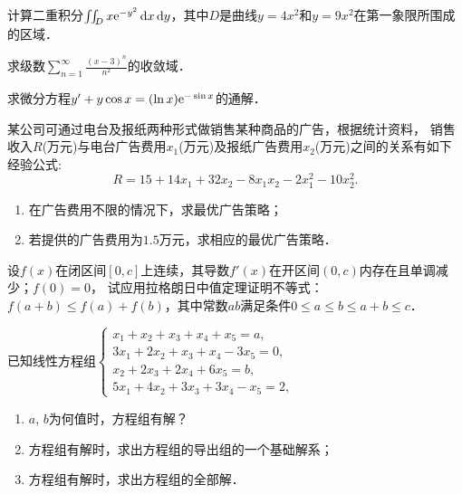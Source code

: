 \documentclass[plain,noanswer,medmath]{../../template/jnuexam}
\begin{document}
\begin{problem}
计算二重积分$\iint_D x\mathrm{e}^{-y^2}\mathop{}\!\mathrm{d} x\mathop{}\!\mathrm{d} y$，其中$D$是曲线$y=4x^2$和$y=9x^2$在第一象限所围成的区域．
\end{problem}


\begin{problem}
求级数$\sum_{n=1}^{\infty}\frac{(x-3)^n}{n^2}$的收敛域．
\end{problem}


\begin{problem}
求微分方程$y'+y\cos x=(\ln x)\mathrm{e}^{-\sin x}$的通解．
\end{problem}




\begin{problem}
某公司可通过电台及报纸两种形式做销售某种商品的广告，根据统计资料，
销售收入$R$(万元)与电台广告费用$x_1$(万元)及报纸广告费用$x_2$(万元)之间的关系有如下经验公式:
$$R=15+14x_1+32x_2-8x_1x_2-2x_1^2-10x_2^2.$$
\begin{enumerate}
\item 在广告费用不限的情况下，求最优广告策略；
\item 若提供的广告费用为$1.5$万元，求相应的最优广告策略．
\end{enumerate}
\end{problem}




\begin{problem}
设$f(x)$在闭区间$[0,c]$上连续，其导数$f'(x)$在开区间$(0,c)$内存在且单调减少；$f(0)=0$，
试应用拉格朗日中值定理证明不等式：$f(a+b)\le f(a)+f(b)$，其中常数$ab$满足条件$0\le a\le b\le a+b\le c$．
\end{problem}




\begin{problem}
已知线性方程组$\begin{cases}
  x_1+x_2+x_3+x_4+x_5=a, \\
  3x_1+2x_2+x_3+x_4-3x_5=0, \\
  x_2+2x_3+2x_4+6x_5=b, \\
  5x_1+4x_2+3x_3+3x_4-x_5=2,
\end{cases}$
\begin{enumerate}
\item $a$, $b$为何值时，方程组有解？
\item 方程组有解时，求出方程组的导出组的一个基础解系；
\item 方程组有解时，求出方程组的全部解．
\end{enumerate}
\end{problem}
\end{document}
